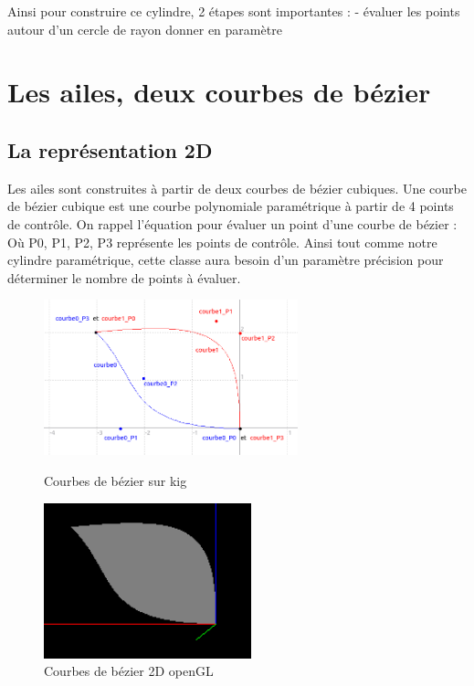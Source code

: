 \documentclass{article}
\begin{document}
Ainsi pour construire ce cylindre, 2 étapes sont importantes : 
- évaluer les points autour d'un cercle de rayon donner en paramètre


\section{Les ailes, deux courbes de bézier}

\subsection{La représentation 2D}

Les ailes sont construites à partir de deux courbes de bézier cubiques. Une courbe de bézier cubique est une courbe polynomiale paramétrique à partir de 4 points de contrôle. On rappel l'équation pour évaluer un point d'une courbe de bézier :
\equabezier
Où P0, P1, P2, P3 représente les points de contrôle. Ainsi tout comme notre cylindre paramétrique, cette classe aura besoin d'un paramètre précision pour déterminer le nombre de points à évaluer.

\begin{figure}[!htb]
	\begin{minipage}{0.5\textwidth}
    	\centering
    	\includegraphics[height=4.5cm]{./assets/kig_bezier.png}
    	\caption{Courbes de bézier sur kig}
	\end{minipage}
	\hfill
	\begin{minipage}{0.5\textwidth}
    	\centering
    	\includegraphics[height=4.5cm]{./assets/2D_bezier.png}
    	\caption{Courbes de bézier 2D openGL}
	\end{minipage}
\end{figure}
\end{document}
